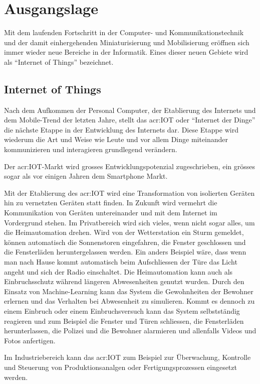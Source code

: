 \chapter{Ausgangslage}

Mit dem laufenden Fortschritt in der Computer- und Kommunikationstechnik und der damit einhergehenden Miniaturisierung und Mobilisierung eröffnen sich immer wieder neue Bereiche in der Informatik. Eines dieser neuen Gebiete wird als "`Internet of Things"' bezeichnet.


\section{Internet of Things}
Nach dem Aufkommen der Personal Computer, der Etablierung des Internets und dem Mobile-Trend der letzten Jahre, stellt das \gls{acr:IOT} oder "`Internet der Dinge"' die nächste Etappe in der Entwicklung des Internets dar. Diese Etappe wird wiederum die Art und Weise wie Leute und vor allem Dinge miteinander kommunizieren und interagieren grundlegend verändern.

Der \gls{acr:IOT}-Markt wird grosses Entwicklungspotenzial zugeschrieben, ein grösses sogar als vor einigen Jahren dem Smartphone Markt. 

Mit der Etablierung des \gls{acr:IOT} wird eine Transformation von isolierten Geräten hin zu vernetzten Geräten statt finden. In Zukunft wird vermehrt die Kommunikation von Geräten untereinander und mit dem Internet im Vordergrund stehen. Im Privatbereich wird sich vieles, wenn nicht sogar alles, um die Heimautomation drehen. Wird von der Wetterstation ein Sturm gemeldet, können automatisch die Sonnenstoren eingefahren, die Fenster geschlossen und die Fensterläden heruntergelassen werden. Ein anders Beispiel wäre, dass wenn man nach Hause kommt automatisch beim Aufschliessen der Türe das Licht angeht und sich der Radio einschaltet. Die Heimautomation kann auch als Einbruchsschutz während längeren Abwesenheiten genutzt wurden. Durch den Einsatz von Machine-Learning kann das System die Gewohnheiten der Bewohner erlernen und das Verhalten bei Abwesenheit zu simulieren. Kommt es dennoch zu einem Einbruch oder einem Einbruchsversuch kann das System selbstständig reagieren und zum Beispiel die Fenster und Türen schliessen, die Fensterläden herunterlassen, die Polizei und die Bewohner alarmieren und allenfalls Videos und Fotos anfertigen.

Im Industriebereich kann das \gls{acr:IOT} zum Beispiel zur Überwachung, Kontrolle und Steuerung von Produktionsanalgen oder Fertigungsprozessen eingesetzt werden. 

